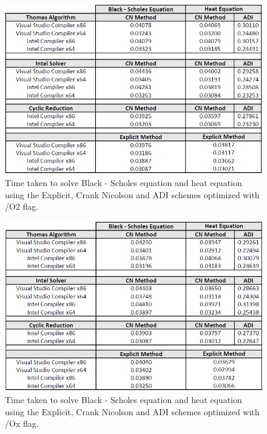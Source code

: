 \documentclass[12pt, oneside]{book}
\theoremstyle{plain}
\theoremstyle{definition}
\begin{document}
\begin{figure}[!htb]
    \centering
        \includegraphics[scale=0.6]{o2Optimized.png}
    \caption{Time taken to solve Black - Scholes equation and heat equation using the Explicit, Crank Nicolson and ADI schemes  optimized with /O2 flag.}
\end{figure}

\begin{figure}[!htb]
    \centering
        \includegraphics[scale=0.6]{oXOptimized.png}
    \caption{Time taken to solve Black - Scholes equation and heat equation using the Explicit, Crank Nicolson and ADI schemes optimized with /Ox flag.}
\end{figure}
\end{document}
